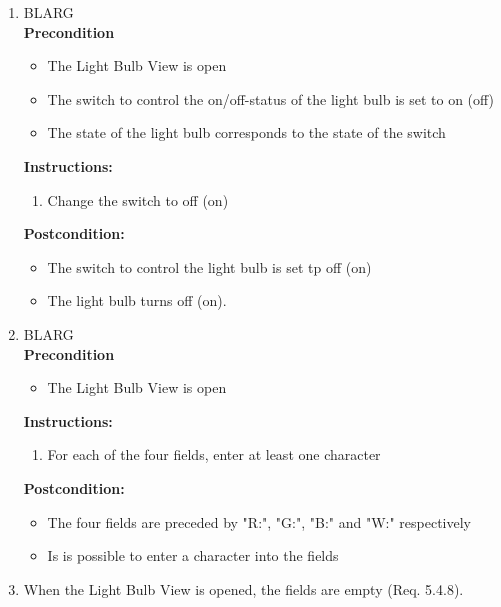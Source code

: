 \documentclass[a4paper]{article}
\newlength{\testlabellength}
\newenvironment{testlist}{\begin{enumerate}[label=\bfseries Instruction \thesubsection.\arabic* , labelindent=0pt, labelwidth=\testlabellength , leftmargin=2cm]}{\end{enumerate}}
\newenvironment{precondition}{
{\color{white}BLARG}\\ 
\textbf{Precondition}
\begin{itemize}[labelindent=0cm, labelwidth=2cm , leftmargin=1cm]
}
{\end{itemize}}
\newenvironment{instruction}{
\textbf{Instructions:}
\begin{enumerate}[label=\bfseries  \arabic*., labelindent=0cm, labelwidth=2cm , leftmargin=1cm]
}
{\end{enumerate}}
\newenvironment{postcondition}{
\textbf{Postcondition:}
\begin{itemize}[labelindent=0cm, labelwidth=2cm , leftmargin=1cm]
}
{\end{itemize}}
\begin{document}
\begin{appendices}
\begin{testlist}
	\item
		\begin{precondition}
			\item The Light Bulb View is open
			\item The switch to control the on/off-status of the light bulb is set to on (off)
			\item The state of the light bulb corresponds to the state of the switch
		\end{precondition}
    	\begin{instruction}
    		\item Change the switch to off (on)
    	\end{instruction}
    	\begin{postcondition}
    		\item The switch to control the light bulb is set tp off (on)
    		\item The light bulb turns off (on).
    	\end{postcondition}
    		
  
    
   	\item
   		\begin{precondition}
   			\item The Light Bulb View is open
		\end{precondition}
    	\begin{instruction}
    		\item For each of the four fields, enter at least one character
    	\end{instruction}
    	\begin{postcondition}
    		\item The four fields are preceded by "R:", "G:", "B:" and "W:" respectively
    		\item Is is possible to enter a character into the fields
    	\end{postcondition}

	
	\item When the Light Bulb View is opened, the fields are empty (Req. 5.4.8).


\end{testlist}
\end{appendices}
\end{document}

